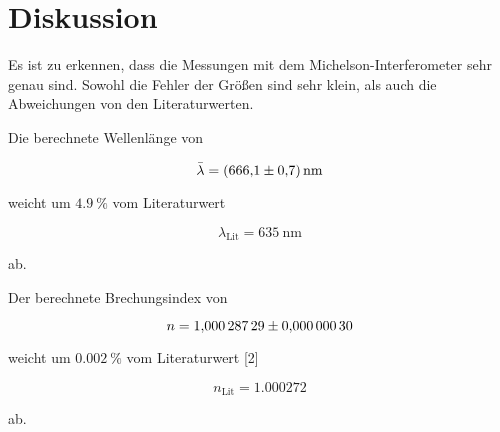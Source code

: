 \section{Diskussion}
\label{sec:Diskussion}

Es ist zu erkennen, dass die Messungen mit dem Michelson-Interferometer sehr genau sind.
Sowohl die Fehler der Größen sind sehr klein, als auch die Abweichungen von den Literaturwerten.

Die berechnete Wellenlänge von

\begin{equation*}
    \bar{\lambda} = \SI{666.1 +- 0.7}{\nano\meter}
\end{equation*}

weicht um $\SI{4.9}{\percent}$ vom Literaturwert

\begin{equation*}
    \lambda_\text{Lit} = \SI{635}{\nano\meter}
\end{equation*}

ab.

Der berechnete Brechungsindex von

\begin{equation*}
    n = \num{1.00028729 +- 0.00000030}
\end{equation*}

weicht um $\SI{0.002}{\percent}$ vom Literaturwert [2]

\begin{equation*}
    n_\text{Lit} = \num{1.000272}
\end{equation*}

ab.

